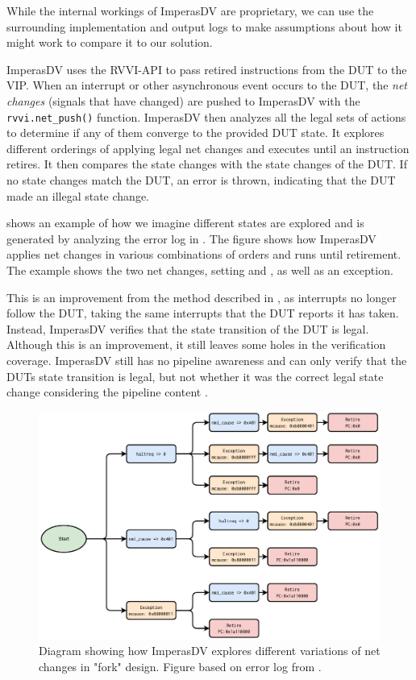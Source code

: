 While the internal workings of ImperasDV are proprietary, we can use the surrounding implementation and output logs \cite{ISSMismatchPending2023} to make assumptions about how it might work to compare it to our solution.

ImperasDV uses the RVVI-API to pass retired instructions from the DUT to the VIP. When an interrupt or other asynchronous event occurs to the DUT, the \textit{net changes} (signals that have changed) are pushed to ImperasDV with the \lstinline{rvvi.net_push()} function. ImperasDV then analyzes all the legal sets of actions to determine if any of them converge to the provided DUT state. 
It explores different orderings of applying legal net changes and executes until an instruction retires. It then compares the state changes with the state changes of the DUT. If no state changes match the DUT, an error is thrown, indicating that the DUT made an illegal state change.

 shows an example of how we imagine different states are explored and is generated by analyzing the error log in \cite{ISSMismatchPending2023}. The figure shows how ImperasDV applies net changes in various combinations of orders and runs until retirement. The example shows the two net changes, setting  and , as well as an exception. 

This is an improvement from the method described in , as interrupts no longer follow the DUT, taking the same interrupts that the DUT reports it has taken. Instead, ImperasDV verifies that the state transition of the DUT is legal. Although this is an improvement, it still leaves some holes in the verification coverage.
ImperasDV still has no pipeline awareness and can only verify that the DUTs state transition is legal, but not whether it was the correct legal state change considering the pipeline content \cite{taylorAdvancedRISCVVerification2023}.

\begin{figure}
    \centering
    \includegraphics[width=1.0\linewidth]{figures/ImperasExecution.pdf}
    \caption{Diagram showing how ImperasDV explores different variations of net changes in "fork" design. Figure based on error log from \cite{ISSMismatchPending2023}. }
    \label{fig:imperasFork}
\end{figure}

